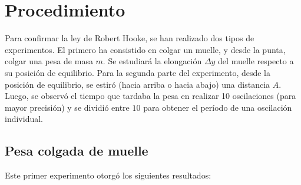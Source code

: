\documentclass{article}
\begin{document}
\section{Procedimiento}
Para confirmar la ley de Robert Hooke, se han realizado dos tipos de experimentos. El primero ha consistido en colgar un muelle, y desde la punta, colgar una pesa de masa $m$. Se estudiará la elongación $\Delta y$ del muelle respecto a su posición de equilibrio. Para la segunda parte del experimento, desde la posición de equilibrio, se estiró (hacia arriba o hacia abajo) una distancia $A$. Luego, se observó el tiempo que tardaba la pesa en realizar 10 oscilaciones (para mayor precisión) y se dividió entre $ 10 $ para obtener el período de una oscilación individual.
\subsection{Pesa colgada de muelle}
Este primer experimento otorgó los siguientes resultados:
\begin{table}[h]
	\centering

	\begin{tabular}{c | c | c | c | c | c}
		
	\end{tabular}
\end{table}
\end{document}
